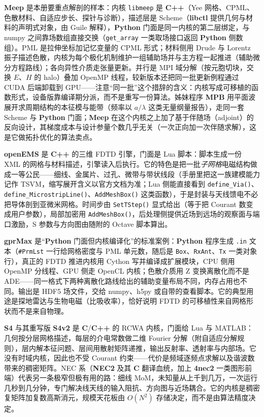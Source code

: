 \documentclass[12pt,a4paper,fontset=fandol]{ctexbook}
\newcommand{\Fn}[1]{\texttt{#1()}}
\newcommand{\Tp}[1]{\texttt{#1}}
\newcommand{\Bk}{\allowbreak}
\newcommand{\Lib}[1]{\textbf{#1}}
\newcommand{\Lang}[1]{\textsf{\bfseries #1}}
\newcommand{\CL}{\Lang{C}}
\newcommand{\CPP}{\Lang{C++}}
\newcommand{\PY}{\Lang{Python}}
\begin{document}
\Lib{Meep} 是本册要重点解剖的样本：内核 \Tp{libmeep} 是 \CPP{}（Yee 网格、CPML、色散材料、自适应步长、探针与诊断），描述层是 Scheme（\Lib{libctl} 提供几何与材料的声明式对象，由 Guile 解释），\PY{} 门面是同一内核的第二层绑定，与 numpy 之间靠场数组直接交换（\Tp{get\_array} \Bk{} 一类取场接口返回 \PY{} 侧数组）。PML 是拉伸坐标加记忆变量的 CPML 形式；材料侧用 Drude 与 Lorentz 振子描述色散，内核为每个极化机制维护一组辅助场并与主方程一起推进（辅助微分方程路线）；各向异性介质走张量更新。并行是 MPI 域分解（按元胞切块，交换 $E$、$H$ 的 halo）叠加 OpenMP 线程，较新版本还把同一批更新例程通过 CUDA 后端卸载到 GPU——注意``同一批''这个措辞的含义：内核写成可移植的函数形式，设备版靠编译期分派，而不是重写一份算法。姊妹程序 \Lib{MPB} 用平面波展开求周期结构的本征模与能带（频率以 $a/\lambda$ 这类无量纲量报告），走同一套 Scheme 与 \PY{} 门面；\Lib{Meep} 在这个内核之上加了基于伴随场（adjoint）的反向设计，其梯度成本与设计参量个数几乎无关（一次正向加一次伴随求解），这是它做拓扑优化的算法卖点。

\Lib{openEMS} 是 \CPP{} 的三维 FDTD 引擎，门面是 Lua 脚本：脚本生成一份 XML 的网格与材料描述，引擎读入后执行。它的特色是把一批\emph{子网格}电磁结构做成一等公民——细线、金属片、过孔、微带与带状线段（手册里把这一族建模能力记作 TSVM，缩写展开含义以官方文档为准；Lua 侧能直接看到 \Fn{define\Bk\_Via}、\Fn{define\Bk\_MicrostripLine}、\Fn{AddMeshBox} 这类函数），于是封装与天线馈电不必把导体剖到亚微米网格。时间步由 \Fn{SetTStep} 显式给出（等于把 Courant 数变成用户参数），局部加密用 \Fn{AddMeshBox}，后处理侧提供近场到远场的观察面与端口激励，S 参数与方向图由随附的 Octave 脚本算出。

\Lib{gprMax} 是``\PY{} 门面但内核编译化''的标准案例：\PY{} 程序生成 \Tp{.in} 文本（\Tp{\#PrmLst} 一行给网格密度与 PML 单元数，随后是 \Tp{Box}、\Tp{RxAnt}、\Tp{Tx} 一类对象行），真正的 FDTD 推进内核用 Cython 写并编译成扩展模块，CPU 侧用 OpenMP 分线程、GPU 侧走 OpenCL 内核；色散介质用 Z 变换离散化而不是 ADE——同一格式下两种离散化路线给出的辅助变量布局不同，内存占用也不同。输出是 HDF5 场文件，交给 numpy、h5py 或自带的查看脚本。它的典型用途是探地雷达与生物电磁（比吸收率），恰好说明 FDTD 的可移植性来自网格形状而不是来自物理。

\Lib{S4} 与其重写版 \Lib{S4v2} 是 \CL/{\Bk}\CPP{} 的 RCWA 内核，门面给 Lua 与 MATLAB：几何按分层网格描述，每层的介电常数做二维 Fourier 分解（附自适应分解规则），层内解本征问题、层间用散射矩阵递推，输出反射率、透射率与内部场。它没有时域内核，因此也不受 Courant 约束——代价是频域逐频点求解以及谐波数带来的稠密矩阵。NEC 系（\Lib{NEC2} 及其 \CL{} 翻译血统，加上 \Lib{4nec2} 一类图形前端）代表另一条极窄但极有用的路：细线 MoM，未知量从上千到几万，一次运行几秒到几分钟，专门解决线天线的输入阻抗、方向图与近场耦合。它的内核是稠密复矩阵加复数高斯消元，规模天花板由 $O(N^{2})$ 存储决定，而不是由算法精度决定。
\end{document}
